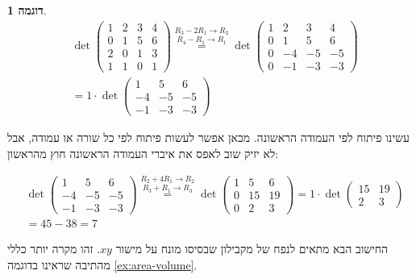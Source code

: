 \documentclass[12pt]{report}
\theoremstyle{plain}
\theoremstyle{definition}
\newtheorem{example}{דוגמה}[chapter]
\newcommand{\0}{\mathbf{0}}
\begin{document}
\begin{example}

$$
\begin{aligned}
&\det\!\begin{pmatrix}
1 & 2 & 3 & 4\\
0 & 1 & 5 & 6\\
2 & 0 & 1 & 3\\
1 & 1 & 0 & 1
\end{pmatrix}
\overset{R_3 - 2R_1 \to R_3}{\overset{R_4 - R_1 \to R_1}{=}}
\det\!\begin{pmatrix}
1 & 2 & 3 & 4\\
0 & 1 & 5 & 6\\
0 & -4 & -5 & -5\\
0 & -1 & -3 & -3
\end{pmatrix}\\
&=
1\cdot
\det\!\begin{pmatrix}
1 & 5 & 6\\
-4 & -5 & -5\\
-1 & -3 & -3
\end{pmatrix}
\end{aligned}
$$

עשינו פיתוח לפי העמודה הראשונה. מכאן אפשר לעשות פיתוח לפי כל שורה או עמודה, אבל לא יזיק שוב לאפס את איברי העמודה הראשונה חוץ מהראשון:

$$
\begin{aligned}
&\det\!\begin{pmatrix}
1 & 5 & 6\\
-4 & -5 & -5\\
-1 & -3 & -3
\end{pmatrix}
\overset{R_2 +4R_1 \to R_2}{\overset{R_3 + R_1 \to R_3}{=}}\det\!\begin{pmatrix}
1 & 5 & 6\\
0 & 15 & 19\\
0 & 2 & 3
\end{pmatrix}=1\cdot\det \begin{pmatrix}
15 & 19 \\
2 & 3
\end{pmatrix}\\
&=45-38=7
\end{aligned}
$$

\end{example}

החישוב הבא מתאים לנפח של מקבילון שבסיסו מונח על מישור 
$xy$.
זהו מקרה יותר כללי מהתיבה שראינו בדוגמה
\ref{ex:area-volume}.
\end{document}

